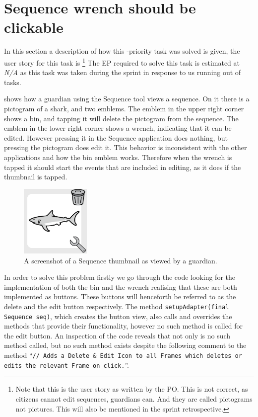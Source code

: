 \section{Sequence wrench should be clickable}
In this section a description of how this \phigh-priority task was solved is given, the user story for this task is \footnote{Note that this is the user story as written by the PO. This is not correct, as citizens cannot edit sequences, guardians can. And they are called pictograms not pictures. This will also be mentioned in the sprint retrospective. }
The EP required to solve this task is estimated at \textit{N/A} as this task was taken during the sprint in response to us running out of tasks.

 shows how a guardian using the Sequence tool views a sequence.
On it there is a pictogram of a shark, and two emblems. 
The emblem in the upper right corner shows a bin, and tapping it will delete the pictogram from the sequence. 
The emblem in the lower right corner shows a wrench, indicating that it can be edited.
However pressing it in the Sequence application does nothing, but pressing the pictogram does edit it. 
This behavior is inconsistent with the other applications and how the bin emblem works. 
Therefore when the wrench is tapped it should start the events that are included in editing, as it does if the thumbnail is tapped.
\begin{figure}
    \centering
    \includegraphics[width=0.3\textwidth]{figures/img/screenshots/Sequence_pictogram.png} 
    \caption{A screenshot of a Sequence thumbnail as viewed by a guardian.}
    \label{fig:seq_wrench} 
    \vspace{-5pt}
\end{figure}
\bigskip
\noindent
In order to solve this problem firstly we go through the code looking for the implementation of both the bin and the wrench realising that these are both implemented as buttons.
These buttons will henceforth be referred to as the delete and the edit button respectively.
The method \texttt{setupAdapter(final Sequence seq)}, which creates the button view, also calls and overrides the methods that provide their functionality, however no such method is called for the edit button.
An inspection of the code reveals that not only is no such method called, but no such method exists despite the following comment to the method \enquote{\texttt{// Adds a Delete \& Edit Icon to all Frames which deletes or edits the relevant Frame on click.}}.

